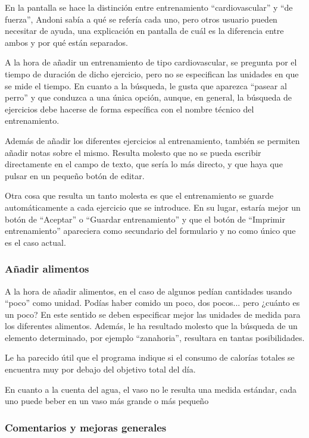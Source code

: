 \documentclass[a4paper]{article}
\begin{document}
			En la pantalla se hace la distinción entre entrenamiento ``cardiovascular'' y ``de fuerza'', Andoni sabía a qué se refería cada uno, pero otros usuario pueden necesitar de ayuda, una explicación en pantalla de cuál es la diferencia entre ambos y por qué están separados.
			
			A la hora de añadir un entrenamiento de tipo cardiovascular, se pregunta por el tiempo de duración de dicho ejercicio, pero no se especifican las unidades en que se mide el tiempo. En cuanto a la búsqueda, le gusta que aparezca ``pasear al perro'' y que conduzca a una única opción, aunque, en general, la búsqueda de ejercicios debe hacerse de forma específica con el nombre técnico del entrenamiento.
			
			Además de añadir los diferentes ejercicios al entrenamiento, también se permiten añadir notas sobre el mismo. Resulta molesto que no se pueda escribir directamente en el campo de texto, que sería lo más directo, y que haya que pulsar en un pequeño botón de editar.
			
			Otra cosa que resulta un tanto molesta es que el entrenamiento se guarde automáticamente a cada ejercicio que se introduce. En su lugar, estaría mejor un botón de ``Aceptar'' o ``Guardar entrenamiento'' y que el botón de ``Imprimir entrenamiento'' apareciera como secundario del formulario y no como único que es el caso actual.
			
			\subsubsection*{Añadir alimentos}
			
			A la hora de añadir alimentos, en el caso de algunos pedían cantidades usando ``poco'' como unidad. Podías haber comido un poco, dos pocos... pero ¿cuánto es un poco? En este sentido se deben especificar mejor las unidades de medida para los diferentes alimentos. Además, le ha resultado molesto que la búsqueda de un elemento determinado, por ejemplo ``zanahoria'', resultara en tantas posibilidades.
			
			Le ha parecido útil que el programa indique si el consumo de calorías totales se encuentra muy por debajo del objetivo total del día.
			
			En cuanto a la cuenta del agua, el vaso no le resulta una medida estándar, cada uno puede beber en un vaso más grande o más pequeño
			
			\subsubsection*{Comentarios y mejoras generales}
			
\end{document}
